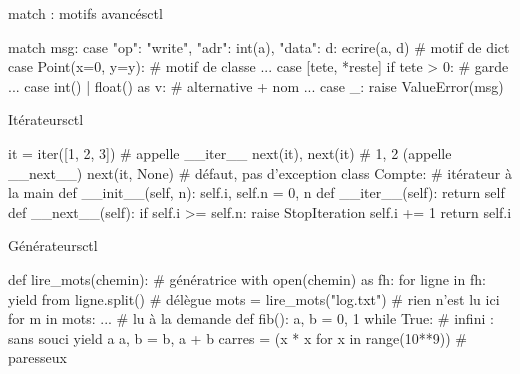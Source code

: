 \documentclass{article}
\begin{document}
\noindent
\begin{colonne}
\begin{bloc}{match : motifs avancés}{ctl}
\begin{code}
match msg:
    case {"op": "write", "adr": int(a), "data": d}:
        ecrire(a, d)                  # motif de dict
    case Point(x=0, y=y):             # motif de classe
        ...
    case [tete, *reste] if tete > 0:  # garde
        ...
    case int() | float() as v:        # alternative + nom
        ...
    case _:
        raise ValueError(msg)
\end{code}
\end{bloc}

\begin{bloc}{Itérateurs}{ctl}
\begin{code}
it = iter([1, 2, 3])  # appelle __iter__
next(it), next(it)    # 1, 2 (appelle __next__)
next(it, None)        # défaut, pas d'exception
class Compte:         # itérateur à la main
    def __init__(self, n): self.i, self.n = 0, n
    def __iter__(self): return self
    def __next__(self):
        if self.i >= self.n: raise StopIteration
        self.i += 1
        return self.i
\end{code}
\end{bloc}

\begin{bloc}{Générateurs}{ctl}
\begin{code}
def lire_mots(chemin):       # génératrice
    with open(chemin) as fh:
        for ligne in fh:
            yield from ligne.split()  # délègue
mots = lire_mots("log.txt")  # rien n'est lu ici
for m in mots: ...           # lu à la demande
def fib():
    a, b = 0, 1
    while True:              # infini : sans souci
        yield a
        a, b = b, a + b
carres = (x * x for x in range(10**9))  # paresseux
\end{code}
\end{bloc}


\end{colonne}
\end{document}
